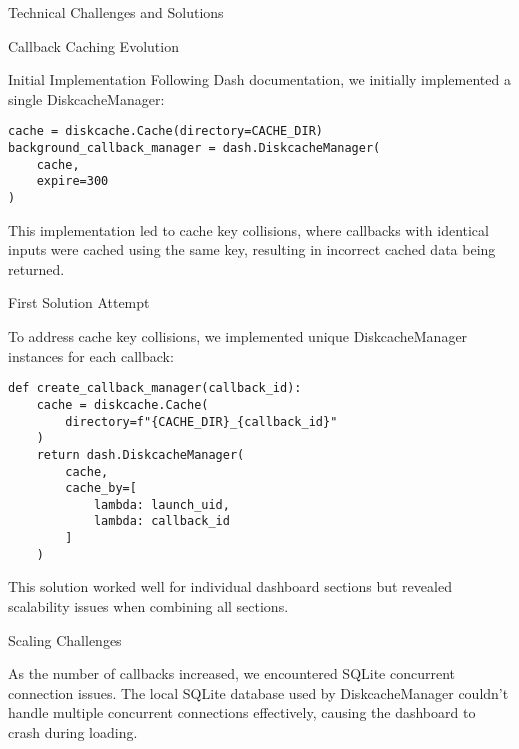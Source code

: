 \begin{section}{Technical Challenges and Solutions}
\begin{subsection}{Callback Caching Evolution}
\begin{subsubsection}{Initial Implementation}
			Following Dash documentation, we initially implemented a single DiskcacheManager:

			\begin{listing}[H]
				\caption{Initial Cache Manager Setup}
				\begin{verbatim}
cache = diskcache.Cache(directory=CACHE_DIR)
background_callback_manager = dash.DiskcacheManager(
    cache,
    expire=300
)
				\end{verbatim}
				\label{listing:dashboard-implementation-cache-initial}
			\end{listing}

			This implementation led to cache key collisions, where callbacks with identical inputs were cached using the same key, resulting in incorrect cached data being returned.

		\end{subsubsection}

		\begin{subsubsection}{First Solution Attempt}
			\label{subsubsec:implementation-technical-challenges-caching-first}

			To address cache key collisions, we implemented unique DiskcacheManager instances for each callback:

			\begin{listing}[H]
				\caption{Unique Cache Managers Per Callback}
				\begin{verbatim}
def create_callback_manager(callback_id):
    cache = diskcache.Cache(
        directory=f"{CACHE_DIR}_{callback_id}"
    )
    return dash.DiskcacheManager(
        cache,
        cache_by=[
            lambda: launch_uid,
            lambda: callback_id
        ]
    )
				\end{verbatim}
				\label{listing:dashboard-implementation-cache-unique}
			\end{listing}

			This solution worked well for individual dashboard sections but revealed scalability issues when combining all sections.

		\end{subsubsection}

		\begin{subsubsection}{Scaling Challenges}
			\label{subsubsec:implementation-technical-challenges-caching-scaling}

			As the number of callbacks increased, we encountered SQLite concurrent connection issues. The local SQLite database used by DiskcacheManager couldn't handle multiple concurrent connections effectively, causing the dashboard to crash during loading.


\end{subsubsection}
\end{subsection}
\end{section}
